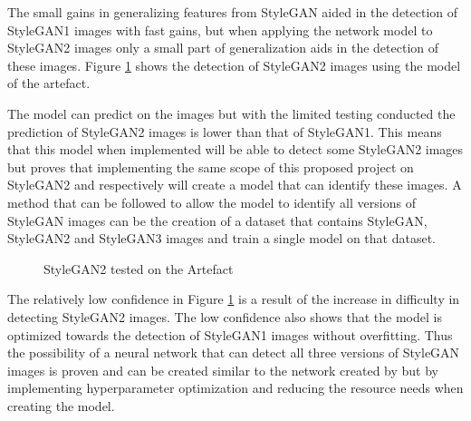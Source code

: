 The small gains in generalizing features from StyleGAN aided in the detection of StyleGAN1 images with fast gains, but when applying the network model to StyleGAN2 images only a small part of generalization aids in the detection of these images. Figure \ref{fig:sg2} shows the detection of StyleGAN2 images using the model of the artefact.

 The model can predict on the images but with the limited testing conducted the prediction of StyleGAN2 images is lower than that of StyleGAN1. This means that this model when implemented will be able to detect some StyleGAN2 images but proves that implementing the same scope of this proposed project on StyleGAN2 and respectively will create a model that can identify these images. A method that can be followed to allow the model to identify all versions of StyleGAN images can be the creation of a dataset that contains StyleGAN, StyleGAN2 and StyleGAN3 images and train a single model on that dataset.

\begin{figure}[H]%
\centering
{}%
\caption{StyleGAN2 tested on the Artefact}%
\label{fig:sg2}%
\end{figure}

The relatively low confidence in Figure \ref{fig:sg2} is a result of the increase in difficulty in detecting StyleGAN2 images. The low confidence also shows that the model is optimized towards the detection of StyleGAN1 images without overfitting. Thus the possibility of a neural network that can detect all three versions of StyleGAN images is proven and can be created similar to the network created by \cite{Wang} but by implementing hyperparameter optimization and reducing the resource needs when creating the model.

